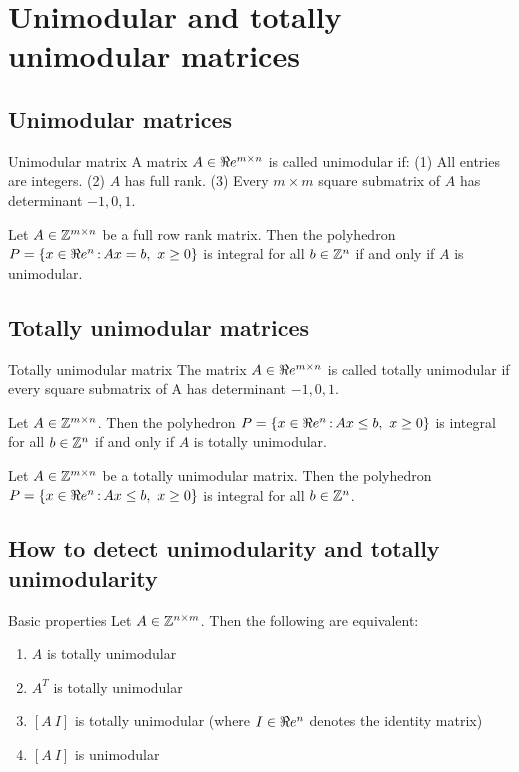 \section{Unimodular and totally unimodular matrices}
\subsection{Unimodular matrices}

\begin{definition}{Unimodular matrix}{}
A matrix $A\in\Re e^{m\times n}$ is called unimodular if: (1) All entries are integers.
	(2) $A$ has full rank. (3) Every $m\times m$ square submatrix of $A$ has determinant $-1,0,1$.
\end{definition}

\begin{theorem}{}{} Let $A\in{\mathbb{Z}}^{m\times n}$ be a full row rank matrix. Then the polyhedron $P=\{x\in\Re e^n{\,:\,} Ax=b,\ x\geq 0\}$ is integral for all $b\in{\mathbb{Z}}^n$ if and only if $A$ is unimodular.
\end{theorem}



\subsection{Totally unimodular matrices}
\begin{definition}{Totally unimodular matrix}{}
The matrix $A\in\Re e^{m\times n}$ is called totally unimodular if every square submatrix
of A has determinant $-1,0,1$.
\end{definition}

\begin{theorem}{}{} Let $A\in{\mathbb{Z}}^{m\times n}$. Then the polyhedron $P=\{x\in\Re e^n{\,:\,} Ax\leq b,\ x\geq 0\}$ is integral for all $b\in{\mathbb{Z}}^n$ if and only if $A$ is totally unimodular.
\end{theorem}

\begin{theorem}{}{} Let $A\in{\mathbb{Z}}^{m\times n}$ be a totally unimodular matrix. Then the polyhedron $P=\{x\in\Re e^n{\,:\,} Ax\leq b,\ x\geq 0\}$ is integral for all $b\in{\mathbb{Z}}^n$.
\end{theorem}

\subsection{How to detect unimodularity and totally unimodularity}

\begin{theorem}{Basic properties}{} Let  $A\in{\mathbb{Z}}^{n\times m}$. Then the following are equivalent: 
\begin{enumerate}
	\item $A$ is totally unimodular
	\item $A^T$ is totally unimodular
	\item  $[A\ I]$ is totally unimodular (where $I\in \Re e^n$ denotes the identity matrix)
	\item $[A\ I]$ is unimodular
\end{enumerate}
\end{theorem}

